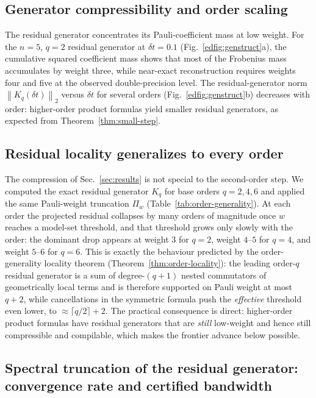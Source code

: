 \documentclass[aps,prresearch,reprint,superscriptaddress,nofootinbib,amsmath,amssymb]{revtex4-2}
\newcommand{\norm}[1]{\left\lVert #1 \right\rVert}
\newcommand{\dt}{\delta t}
\begin{document}
\subsection{Generator compressibility and order scaling}

The residual generator concentrates its Pauli-coefficient mass at low weight. For the $n=5$, $q=2$ residual generator at $\dt=0.1$ (Fig.~\ref{edfig:genstruct}a), the cumulative squared coefficient mass shows that most of the Frobenius mass accumulates by weight three, while near-exact reconstruction requires weights four and five at the observed double-precision level. The residual-generator norm $\norm{K_q(\dt)}_2$ versus $\dt$ for several orders (Fig.~\ref{edfig:genstruct}b) decreases with order: higher-order product formulas yield smaller residual generators, as expected from Theorem~\ref{thm:small-step}.

\subsection{Residual locality generalizes to every order}
\label{sec:order-generality}

The compression of Sec.~\ref{sec:results} is not special to the second-order step. We computed the exact residual generator $K_q$ for base orders $q=2,4,6$ and applied the same Pauli-weight truncation $\Pi_w$ (Table~\ref{tab:order-generality}). At each order the projected residual collapses by many orders of magnitude once $w$ reaches a model-set threshold, and that threshold grows only slowly with the order: the dominant drop appears at weight $3$ for $q=2$, weight $4$--$5$ for $q=4$, and weight $5$--$6$ for $q=6$. This is exactly the behaviour predicted by the order-generality locality theorem (Theorem~\ref{thm:order-locality}): the leading order-$q$ residual generator is a sum of degree-$(q{+}1)$ nested commutators of geometrically local terms and is therefore supported on Pauli weight at most $q+2$, while cancellations in the symmetric formula push the \emph{effective} threshold even lower, to $\approx\lceil q/2\rceil+2$. The practical consequence is direct: higher-order product formulas have residual generators that are \emph{still} low-weight and hence still compressible and compilable, which makes the frontier advance below possible.



\subsection{Spectral truncation of the residual generator: convergence rate and certified bandwidth}
\label{sec:spectral}
\end{document}
